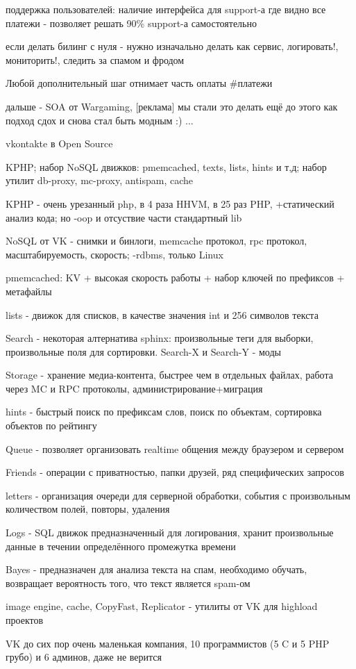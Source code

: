   \item поддержка пользователей: наличие интерфейса для support-а где видно все платежи - позволяет решать 90\% support-а самостоятельно
  \item если делать билинг с нуля - нужно изначально делать как сервис, логировать!, мониторить!, следить за спамом и фродом
  \item Любой дополнительный шаг отнимает часть оплаты #платежи
  \item дальше - SOA от Wargaming, [реклама] мы стали это делать ещё до этого как подход сдох и снова стал быть модным :) ...
  \item vkontakte в Open Source
  \item KPHP; набор NoSQL движков: pmemcached, texts, lists, hints и т,д; набор утилит db-proxy, mc-proxy, antispam, cache
  \item KPHP - очень урезанный php, в 4 раза HHVM, в 25 раз PHP, +статический анализ кода; но -oop и отсуствие части стандартный lib
  \item NoSQL от VK - снимки и бинлоги, memcache протокол, rpc протокол, масштабируемость, скорость; -rdbms, только Linux
  \item pmemcached: KV + высокая скорость работы + набор ключей по префиксов + метафайлы
  \item lists - движок для списков, в качестве значения int и 256 символов текста
  \item Search - некоторая алтернатива sphinx: произвольные теги для выборки, произвольные поля для сортировки. Search-X и Search-Y - моды
  \item Storage - хранение медиа-контента, быстрее чем в отдельных файлах, работа через MC и RPC протоколы, администрирование+миграция
  \item hints - быстрый поиск по префиксам слов, поиск по объектам, сортировка объектов по рейтингу
  \item Queue - позволяет организовать realtime общения между браузером и сервером
  \item Friends - операции с приватностью, папки друзей, ряд специфических запросов
  \item letters - организация очереди для серверной обработки, события с произвольным количеством полей, повторы, удаления
  \item Logs - SQL движок предназначенный для логирования, хранит произвольные данные в течении определённого промежутка времени
  \item Bayes - предназначен для анализа текста на спам, необходимо обучать, возвращает вероятность того, что текст является spam-ом
  \item image engine, cache, CopyFast, Replicator - утилиты от VK для highload проектов
  \item VK до сих пор очень маленькая компания, 10 программистов (5 C и 5 PHP грубо) и 6 админов, даже не верится
